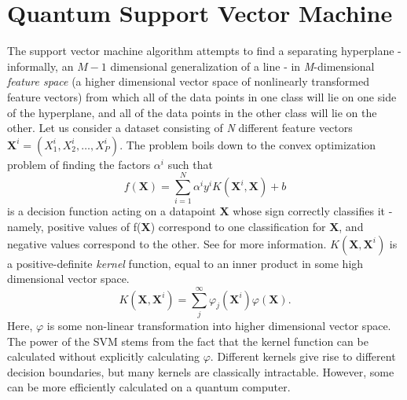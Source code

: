 \documentclass[twocolumn, english]{revtex4-2}
\begin{document}
\section{Quantum Support Vector Machine}

The support vector machine algorithm attempts to find a separating hyperplane - informally, an $\textit{M}-1$ dimensional generalization of a line - in \textit{M}-dimensional \textit{feature space} (a higher dimensional vector space of nonlinearly transformed feature vectors) from which all of the data points in one class will lie on one side of the hyperplane, and all of the data points in the other class will lie on the other. Let us consider a dataset consisting of \textit{N} different feature vectors $\textbf{X}^{i} = (\textit{X}^{i}_{1}, \textit{X}^{i}_{2}, …, \textit{X}^{i}_{P})$. The problem boils down to the convex optimization problem of finding the factors $\alpha^{i}$ such that \begin{equation}f(\textbf{X})=\sum_{i=1}^{N}\alpha^{i}y^{i}K(\textbf{X}^{i}, \textbf{X})+b\end{equation} is a decision function acting on a datapoint $\textbf{X}$ whose sign correctly classifies it - namely, positive values of f(\textbf{X}) correspond to one classification for \textbf{X}, and negative values correspond to the other. See \cite{Smola2004} for more information. $\textit{K}(\textbf{X}, \textbf{X}^{i})$ is a positive-definite \textit{kernel} function, equal to an inner product in some high dimensional vector space. \begin{equation}\textit{K}(\textbf{X}, \textbf{X}^{i})=\sum_{j}^{\infty}\varphi_{j}(\textbf{X}^{i})\varphi(\textbf{X}).\end{equation} Here, $\varphi$ is some non-linear transformation into higher dimensional vector space. The power of the SVM stems from the fact that the kernel function can be calculated without explicitly calculating $\varphi$. Different kernels give rise to different decision boundaries, but many kernels are classically intractable. However, some can be more efficiently calculated on a quantum computer. 
\end{document}
